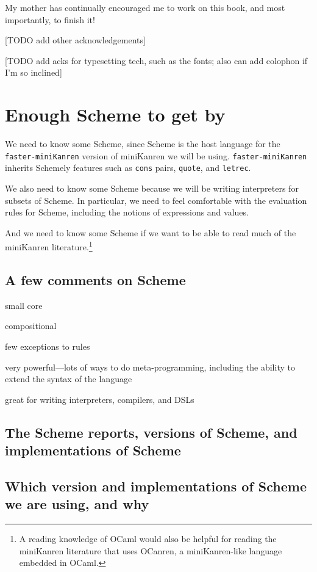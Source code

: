 \documentclass{book}
\begin{document}
My mother has continually encouraged me to work on this book, and most importantly, to finish it!

[TODO add other acknowledgements]

[TODO add acks for typesetting tech, such as the fonts; also can add colophon if I'm so inclined]

\mainmatter

\chapter{Enough Scheme to get by} %

We need to know some Scheme, since Scheme is the host language for the \texttt{faster-miniKanren} version of miniKanren we will be using. \texttt{faster-miniKanren} inherits Schemely features such as \texttt{cons} pairs, \texttt{quote}, and \texttt{letrec}.

We also need to know some Scheme because we will be writing interpreters for subsets of Scheme.  In particular, we need to feel comfortable with the evaluation rules for Scheme, including the notions of expressions and values.

And we need to know some Scheme if we want to be able to read much of the miniKanren literature.\footnote{A reading knowledge of OCaml would also be helpful for reading the miniKanren literature that uses OCanren, a miniKanren-like language embedded in OCaml.}

\section{A few comments on Scheme}

small core

compositional

few exceptions to rules

very powerful---lots of ways to do meta-programming, including the
ability to extend the syntax of the language

great for writing interpreters, compilers, and DSLs

\section{The Scheme reports, versions of Scheme, and implementations of Scheme}

\section{Which version and implementations of Scheme we are using, and why}
\end{document}
